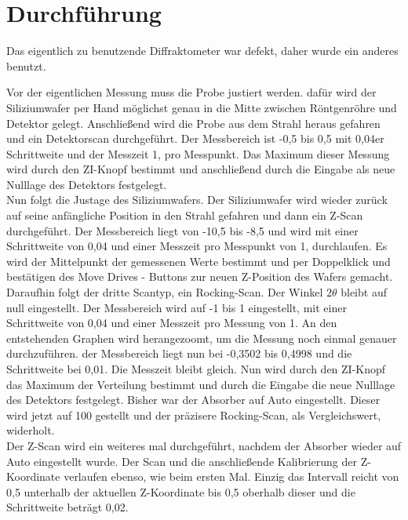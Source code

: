 \section{Durchführung}
\label{sec:Durchführung}
Das eigentlich zu benutzende Diffraktometer war defekt, daher wurde ein anderes benutzt.

Vor der eigentlichen Messung muss die Probe justiert werden. dafür wird der Siliziumwafer per Hand möglichst genau in die Mitte 
zwischen Röntgenröhre und Detektor gelegt. 
Anschließend wird die Probe aus dem Strahl heraus gefahren und ein Detektorscan durchgeführt.
Der Messbereich ist -0,5 bis 0,5 mit 0,04er Schrittweite und der Messzeit 1, pro Messpunkt. 
Das Maximum dieser Messung wird durch den \glqq ZI\grqq{}-Knopf bestimmt und anschließend durch die Eingabe als neue Nulllage des Detektors festgelegt.\\

Nun folgt die Justage des Siliziumwafers.
Der Siliziumwafer wird wieder zurück auf seine anfängliche Position in den Strahl gefahren und dann ein Z-Scan durchgeführt.
Der Messbereich liegt von -10,5 bis -8,5 und wird mit einer Schrittweite von 0,04 und einer Messzeit pro Messpunkt von 1, durchlaufen.
Es wird der Mittelpunkt der gemessenen Werte bestimmt und per Doppelklick und bestätigen des \glqq Move Drives\grqq{} - Buttons zur neuen Z-Position des Wafers gemacht.\\

Daraufhin folgt der dritte Scantyp, ein Rocking-Scan.
Der Winkel $2 \theta$ bleibt auf null eingestellt. Der Messbereich wird auf -1 bis 1 eingestellt, mit einer Schrittweite von 0,04 und einer Messzeit pro Messung von 1.
An den entstehenden Graphen wird herangezoomt, um die Messung noch einmal genauer durchzuführen. der Messbereich liegt nun bei -0,3502 bis 0,4998 und die 
Schrittweite bei 0,01. Die Messzeit bleibt gleich. Nun wird durch den \glqq ZI\grqq{}-Knopf das Maximum der Verteilung bestimmt und durch die Eingabe die neue Nulllage des Detektors 
festgelegt.
Bisher war der Absorber auf \glqq Auto\grqq{} eingestellt. Dieser wird jetzt auf 100 gestellt und der präzisere Rocking-Scan, als Vergleichswert, widerholt.\\

Der Z-Scan wird ein weiteres mal durchgeführt, nachdem der Absorber wieder auf \glqq Auto\grqq{} eingestellt wurde.
Der Scan und die anschließende Kalibrierung der Z-Koordinate verlaufen ebenso, wie beim ersten Mal.
Einzig das Intervall reicht von 0,5 unterhalb der aktuellen Z-Koordinate bis 0,5 oberhalb dieser und die Schrittweite beträgt 0,02.\\

